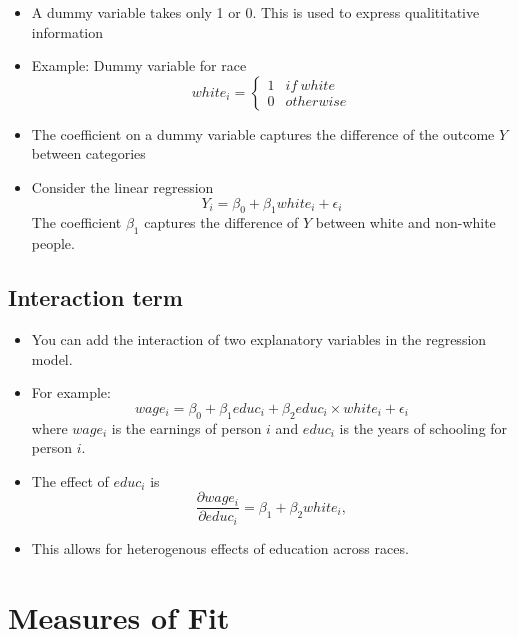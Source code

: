 \documentclass[]{book}
\providecommand{\tightlist}{%
  \setlength{\itemsep}{0pt}\setlength{\parskip}{0pt}}
\begin{document}
\begin{itemize}
\tightlist
\item
  A dummy variable takes only 1 or 0. This is used to express
  qualititative information
\item
  Example: Dummy variable for race \[
  white_{i}=\begin{cases}
  1 & if\ white\\
  0 & otherwise
  \end{cases} 
     \]
\item
  The coefficient on a dummy variable captures the difference of the
  outcome \(Y\) between categories
\item
  Consider the linear regression \[
  Y_i = \beta_0 + \beta_1 white_i + \epsilon_i
  \] The coefficient \(\beta_1\) captures the difference of \(Y\)
  between white and non-white people.
\end{itemize}

\subsection{Interaction term}\label{interaction-term}

\begin{itemize}
\tightlist
\item
  You can add the interaction of two explanatory variables in the
  regression model.
\item
  For example: \[
  wage_i = \beta_0 + \beta_1 educ_i + \beta_2 educ_i \times white_i + \epsilon_i
  \] where \(wage_i\) is the earnings of person \(i\) and \(educ_i\) is
  the years of schooling for person \(i\).
\item
  The effect of \(educ_i\) is \[
  \frac{\partial wage_i}{\partial educ_i} = \beta_1 + \beta_2 white_i,
  \]
\item
  This allows for heterogenous effects of education across races.
\end{itemize}

\section{Measures of Fit}\label{measures-of-fit}
\end{document}
